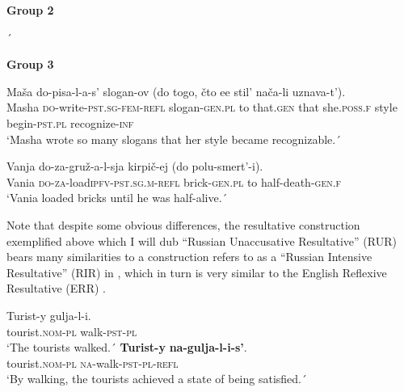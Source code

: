 \documentclass[output=paper,colorlinks,citecolor=brown,modfonts,nonflat]{langsci/langscibook}
\begin{document}
\textbf{Group 2}

\ea[*]{%
    \label{ex:antonyuk:31}
    \gll    Maša do-ugošč-a-l-a-s’ podrug (do togo, čto vse popa-li v reanimacij-u).\\
            Masha \textsc{do-}treat\textsc{-ind-pst.sg-f-refl} friend\textsc{.gen.pl} \hspaceThis{[}to that\textsc{.gen} that all get\textsc{-pst.pl} in ICU\textsc{-prep.f}\\
    \glt    `Masha treated her girlfriends to the point of everyone ending up in ICU.}´
    \z

\ea[*]{%
    \label{ex:antonyuk:32}
    \gll    Maša do-obiž-a-l-a-s’ druz-ej (do togo, čto o-sta-la-s’ odn-a).\\
            Masha \textsc{do-}insult\textsc{-ind-st.sg-fem-refl} friend\textsc{-gen.pl} \hspaceThis{[}to that\textsc{.gen} that \textsc{o-}remain\textsc{-pst.sg.f-refl} alone\textsc{-sg.f}\\
    \glt    `Masha kept insulting friends to the point that she had noone left.´}
    \z

\textbf{Group 3}

\ea%
    \label{ex:antonyuk:33}
    \gll    Maša do-pisa-l-a-s’ slogan-ov (do togo, čto ee stil’ nača-li uznava-t’).\\
            Masha \textsc{do-}write\textsc{-pst.sg-fem-refl} slogan\textsc{-gen.pl} \hspaceThis{[}to that\textsc{.gen} that she\textsc{.poss.f} style begin\textsc{-pst.pl} recognize\textsc{-inf}\\
    \glt    `Masha wrote so many slogans that her style became recognizable.´
    \z

\ea%
    \label{ex:antonyuk:34}
    \gll    Vanja do-za-gruž-a-l-sja kirpič-ej (do polu-smert’-i).\\
            Vania \textsc{do-za-}load\textsc{ipfv-pst.sg.m-refl} brick\textsc{-gen.pl} \hspaceThis{[}to half-death\textsc{-gen.f}\\
    \glt    `Vania loaded bricks until he was half-alive.´
    \z

Note that despite some obvious differences, the resultative construction exemplified above which I will dub “Russian Unaccusative Resultative” (RUR) bears many similarities to a construction \citet{Tatevosov2010} refers to as a “Russian Intensive Resultative” (RIR) in , which in turn is very similar to the English Reflexive Resultative (ERR) .


\ea%
    \label{ex:antonyuk:35}
    \ea \label{ex:antonyuk:35a}
    \gll    Turist-y gulja-l-i.\\
            tourist\textsc{.nom-pl} walk\textsc{-pst-pl}\\
    \glt    `The tourists walked.´
    \ex \label{ex:antonyuk:35b}
    \gll    \textbf{Turist-y} \textbf{na-gulja-l-i-s’}.\\
            tourist\textsc{.nom-pl} \textsc{na-}walk\textsc{-pst-pl-refl}\\
    \glt    `By walking, the tourists achieved a state of being satisfied.´
    \z
\z
\end{document}
